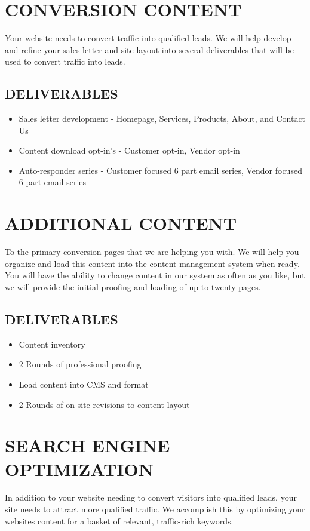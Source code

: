 \documentclass[12pt]{report}
\begin{document}
\section{CONVERSION CONTENT}
\item Your website needs to convert traffic into qualified leads. We will help develop and refine your sales letter and site layout into several deliverables that will be used to convert traffic into leads.
\subsection{DELIVERABLES}
\begin{itemize}
\item Sales letter development - Homepage, Services, Products, About, and Contact Us
\item Content download opt-in's - Customer opt-in, Vendor opt-in
\item Auto-responder series - Customer focused 6 part email series, Vendor focused 6 part email series
\end{itemize}

\section{ADDITIONAL CONTENT}
\item To the primary conversion pages that we are helping you with. We will help you organize and load this content into the content management system when ready. You will have the ability to change content in our system as often as you like, but we will provide the initial proofing and loading of up to twenty pages.
\subsection{DELIVERABLES}
\begin{itemize}
\item Content inventory
\item 2 Rounds of professional proofing
\item Load content into CMS and format
\item 2 Rounds of on-site revisions to content layout
\end{itemize}

\section{SEARCH ENGINE OPTIMIZATION}
\item In addition to your website needing to convert visitors into qualified leads, your site needs to attract more qualified traffic. We accomplish this by optimizing your websites content for a basket of relevant, traffic-rich keywords.
\end{document}
